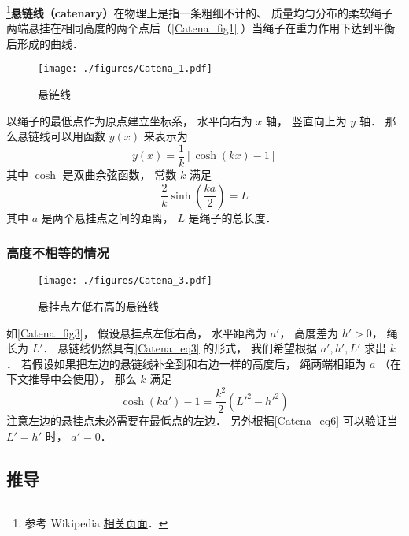

\footnote{参考 Wikipedia \href{https://en.wikipedia.org/wiki/Catenary}{相关页面}．}\textbf{悬链线（catenary）}在物理上是指一条粗细不计的、 质量均匀分布的柔软绳子两端悬挂在相同高度的两个点后（\autoref{Catena_fig1} ）当绳子在重力作用下达到平衡后形成的曲线．

\begin{figure}[ht]
\centering
\texttt{[image: ./figures/Catena\_1.pdf]}
\caption{悬链线} \label{Catena_fig1}
\end{figure}

以绳子的最低点作为原点建立坐标系， 水平向右为 $x$ 轴， 竖直向上为 $y$ 轴． 那么悬链线可以用函数 $y(x)$ 来表示为
\begin{equation}\label{Catena_eq3}
y(x) = \frac{1}{k}[\cosh(kx)-1]
\end{equation}
其中 $\cosh$ 是双曲余弦函数， 常数 $k$ 满足
\begin{equation}
\frac{2}{k}\sinh(\frac{ka}{2}) = L
\end{equation}
其中 $a$ 是两个悬挂点之间的距离， $L$ 是绳子的总长度．

\subsubsection{高度不相等的情况}
\begin{figure}[ht]
\centering
\texttt{[image: ./figures/Catena\_3.pdf]}
\caption{悬挂点左低右高的悬链线} \label{Catena_fig3}
\end{figure}
如\autoref{Catena_fig3}， 假设悬挂点左低右高， 水平距离为 $a'$， 高度差为 $h' > 0$， 绳长为 $L'$． 悬链线仍然具有\autoref{Catena_eq3} 的形式， 我们希望根据 $a', h', L'$ 求出 $k$． 若假设如果把左边的悬链线补全到和右边一样的高度后， 绳两端相距为 $a$ （在下文推导中会使用）， 那么 $k$ 满足
\begin{equation}\label{Catena_eq6}
\cosh(ka') - 1 = \frac{k^2}{2}(L'^2 - h'^2)
\end{equation}
注意左边的悬挂点未必需要在最低点的左边． 另外根据\autoref{Catena_eq6} 可以验证当 $L' = h'$ 时， $a' = 0$．

\subsection{推导}

